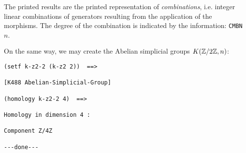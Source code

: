 The printed results are the printed representation of {\em combinations}, i.e.
integer linear combinations of generators resulting from the application of the
morphisms. The degree of the combination is indicated by the information: {\tt CMBN $n$}.
\par
On the same way, we may create the Abelian simplicial groups $K({{\Bbb Z}}/2{{\Bbb Z}}, n)$:
{\footnotesize\begin{verbatim}
(setf k-z2-2 (k-z2 2))  ==>

[K488 Abelian-Simplicial-Group]

(homology k-z2-2 4)  ==>

Homology in dimension 4 :

Component Z/4Z

---done---
\end{verbatim}}

